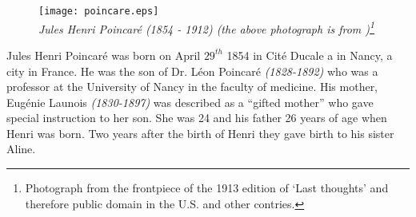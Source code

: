 \documentclass[12pt]{article}
\begin{document}
\begin{figure}
\begin{center}
\texttt{[image: poincare.eps]}\\
\itshape Jules Henri Poincar\'e (1854 - 1912) (the above photograph is from \cite{WHP})\footnote{Photograph from the frontpiece of the 1913 edition of `Last thoughts' and therefore public domain in the U.S. and other contries.}
\end{center}
\end{figure}


Jules Henri Poincar\'e was born on April $29^{th}$ 1854 in Cit\'e Ducale\cite{BA} a  in Nancy, a city in France. He was the son of Dr. L\'eon Poincar\'e \textsl{(1828-1892)} who was a professor at the University of Nancy in the faculty of medicine.\cite{SJ}  His mother, Eug\'enie Launois \textsl{(1830-1897)} was described as a ``gifted mother''\cite{EB} who gave special instruction to her son.  She was 24 and his father 26 years of age when Henri was born\cite{MT}.  Two years after the birth of Henri they gave birth to his sister Aline.\cite{EB}
\end{document}
